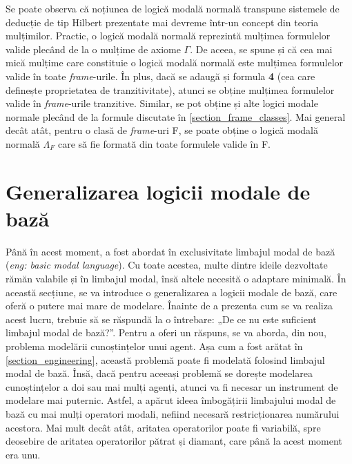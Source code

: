 \documentclass[12pt, openany]{book}
\newcommand{\mysectionreference}[1]{\autoref{#1}}
\newcommand{\myenglishterm}[1]{(\textit{eng: #1})}
\begin{document}
            \par{}
                Se poate observa că noțiunea de logică modală normală transpune sistemele de deducție de tip Hilbert 
                prezentate mai devreme într-un concept din teoria mulțimilor. Practic, o logică modală normală reprezintă 
                mulțimea formulelor valide plecând de la o mulțime de axiome $\Gamma$. De aceea, se spune și că cea mai mică
                mulțime care constituie o logică modală normală este mulțimea formulelor valide în toate 
                \textit{frame}-urile. În plus, dacă se adaugă și formula \textbf{4} (cea care definește proprietatea de 
                tranzitivitate), atunci se obține mulțimea formulelor valide în \textit{frame}-urile tranzitive. Similar, se
                pot obține și alte logici modale normale plecând de la formule discutate în 
                \mysectionreference{section_frame_classes}. Mai general decât atât, pentru o clasă de \textit{frame}-uri F, 
                se poate obține o logică modală normală $\Lambda_F$ care să fie formată din toate formulele valide în F. 

        \section{Generalizarea logicii modale de bază} %
        \label{section_generalization_modal}
            \par{}
                Până în acest moment, a fost abordat în exclusivitate limbajul modal de bază 
                \myenglishterm{basic modal language}. Cu toate acestea, multe dintre ideile dezvoltate rămăn valabile și în
                limbajul modal, însă altele necesită o adaptare minimală. În această secțiune, se va introduce o 
                generalizarea a logicii modale de bază, care oferă o putere mai mare de modelare. Înainte de a prezenta cum 
                se va realiza acest lucru, trebuie să se răspundă la o întrebare: „De ce nu este suficient limbajul 
                modal de bază?”. Pentru a oferi un răspuns, se va aborda, din nou, problema modelării cunoștințelor unui 
                agent. Așa cum a fost arătat în \mysectionreference{section_engineering}, această problemă 
                poate fi modelată folosind limbajul modal de bază. Însă, dacă pentru aceeași problemă se dorește 
                modelarea cunoștințelor a doi sau mai mulți agenți, atunci va fi necesar un instrument de modelare mai 
                puternic. Astfel, a apărut ideea îmbogățirii limbajului modal de bază cu mai mulți operatori modali, 
                nefiind necesară restricționarea numărului acestora. Mai mult decât atât, aritatea operatorilor poate fi 
                variabilă, spre deosebire de aritatea operatorilor pătrat și diamant, care până la acest moment era unu.
\end{document}
